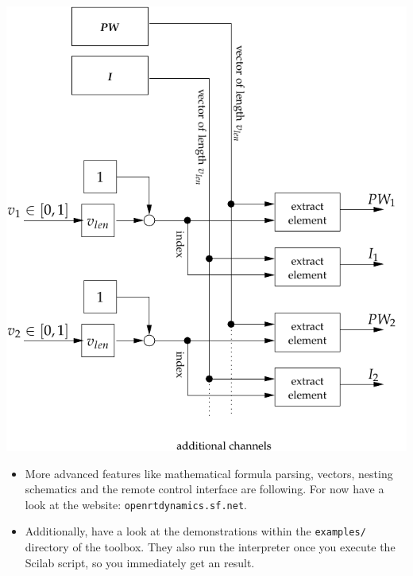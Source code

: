 \documentclass[serif,9pt,xcolor=dvipsnames]{beamer}
\begin{document}
\begin{frame}[fragile]
{     \begin{minipage}{0.55\linewidth}
\hspace{-1.8cm}
\vspace{2cm}
	\centering \includegraphics[width=1.0\linewidth]{figures/charge_control.pdf} 

     \end{minipage}    
  }

\end{frame}




\begin{frame}
\begin{itemize}
 \item More advanced features like mathematical formula parsing, vectors, nesting schematics and the remote control interface are following. For now have a look at the website: \texttt{openrtdynamics.sf.net}.
  \item Additionally, have a look at the demonstrations within the \texttt{examples/} directory of the toolbox. They also run the interpreter once you execute the Scilab script, so you immediately get an result.
\end{itemize}

\end{frame}
\end{document}
